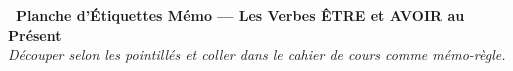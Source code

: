 \documentclass[a4paper,10pt]{article}
\begin{document}
\begin{center}
{\small\textbf{\textcolor{primary}{\faCut\ Planche d'Étiquettes Mémo — Les Verbes ÊTRE et AVOIR au Présent}} \quad {}}\\[2pt]
{\scriptsize\textit{Découper selon les pointillés et coller dans le cahier de cours comme mémo-règle.}}
\end{center}
\vspace{-4pt}

\noindent
\begin{minipage}[t]{0.488\textwidth}
\vignetteCard
\vspace{-3pt}
\cutLineH
\vspace{-3pt}
\vignetteCard
\vspace{-3pt}
\cutLineH
\vspace{-3pt}
\vignetteCard
\vspace{-3pt}
\cutLineH
\vspace{-3pt}
\vignetteCard
\end{minipage}%
\hfill
\begin{minipage}[t]{0.488\textwidth}
\vignetteCard
\vspace{-3pt}
\cutLineH
\vspace{-3pt}
\vignetteCard
\vspace{-3pt}
\cutLineH
\vspace{-3pt}
\vignetteCard
\vspace{-3pt}
\cutLineH
\vspace{-3pt}
\vignetteCard
\end{minipage}
\end{document}
